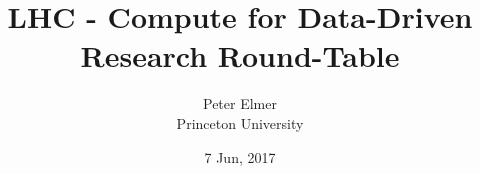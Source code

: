 \documentclass{beamer}
\title{LHC - Compute for Data-Driven Research Round-Table}
\author{Peter Elmer \\ Princeton University}
\date{7 Jun, 2017}
\begin{document}
%

\begin{frame}
  \titlepage
\end{frame}

%



%











\end{document}
